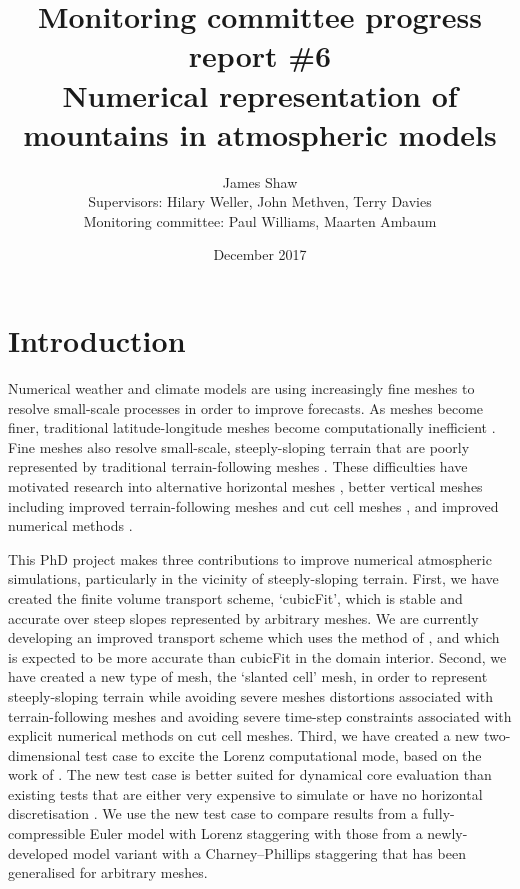 \documentclass[a4paper,11pt]{article}
\title{
\vspace*{-2em}
Monitoring committee progress report \#6\\
\vspace*{1em}
\Large{Numerical representation of mountains in atmospheric models}}
\author{James Shaw
\vspace{0.5em} \\
\large{Supervisors: Hilary Weller, John Methven, Terry Davies}
\vspace{0.5em} \\
\large{Monitoring committee: Paul Williams, Maarten Ambaum}}
\date{December 2017}
\begin{document}
\maketitle

\section{Introduction}

Numerical weather and climate models are using increasingly fine meshes to resolve small-scale processes in order to improve forecasts.  As meshes become finer, traditional latitude-longitude meshes become computationally inefficient \citep{staniforth-thuburn2012}.
Fine meshes also resolve small-scale, steeply-sloping terrain that are poorly represented by traditional terrain-following meshes \citep{schaer2002}.
These difficulties have motivated research into alternative horizontal meshes \citep{staniforth-thuburn2012}, better vertical meshes including improved terrain-following meshes \citep{schaer2002,klemp2011} and cut cell meshes \citep{jaehn2015,yamazaki2016}, and improved numerical methods \citep{ullrich-jablonowski2012,steppeler-klemp2017}.

This PhD project makes three contributions to improve numerical atmospheric simulations, particularly in the vicinity of steeply-sloping terrain.
First, we have created the finite volume transport scheme, `cubicFit', which is stable and accurate over steep slopes represented by arbitrary meshes.
We are currently developing an improved transport scheme which uses the method of \citet{devendran2017}, and which is expected to be more accurate than cubicFit in the domain interior.
%
Second, we have created a new type of mesh, the `slanted cell' mesh, in order to represent steeply-sloping terrain while avoiding severe meshes distortions associated with terrain-following meshes and avoiding severe time-step constraints associated with explicit numerical methods on cut cell meshes.
%
Third, we have created a new two-dimensional test case to excite the Lorenz computational mode, based on the work of \citet{arakawa-konor1996}.  The new test case is better suited for dynamical core evaluation than existing tests that are either very expensive to simulate \citep{untch-hortal2004} or have no horizontal discretisation \citep{arakawa-konor1996}.
We use the new test case to compare results from a fully-compressible Euler model with Lorenz staggering \citep{weller-shahrokhi2014} with those from a newly-developed model variant with a Charney--Phillips staggering that has been generalised for arbitrary meshes.
\end{document}
